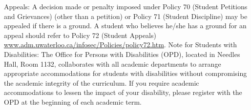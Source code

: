 \documentclass{article}
\begin{document}
\noindent
Appeals: A decision made or penalty imposed under Policy 70 (Student
Petitions and Grievances) (other than a petition) or Policy 71
(Student Discipline) may be appealed if there is a ground. A student
who believes he/she has a ground for an appeal should refer to Policy
72 (Student Appeals)
\url{www.adm.uwaterloo.ca/infosec/Policies/policy72.htm}.  Note for Students
with Disabilities: The Office for Persons with Disabilities (OPD),
located in Needles Hall, Room 1132, collaborates with all academic
departments to arrange appropriate accommodations for students with
disabilities without compromising the academic integrity of the
curriculum. If you require academic accommodations to lessen the
impact of your disability, please register with the OPD at the
beginning of each academic term.
\end{document}
